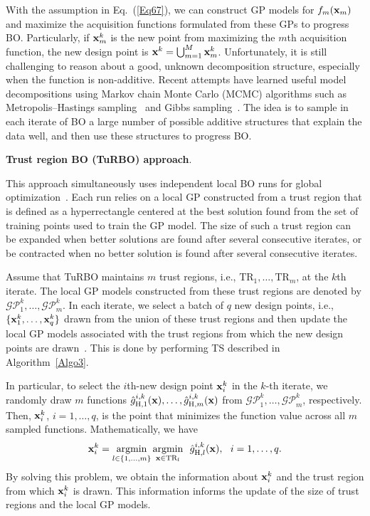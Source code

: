 \documentclass[iicol,sn-basic]{sn-jnl}%
\theoremstyle{thmstyleone}%
\theoremstyle{thmstyletwo}
\theoremstyle{thmstylethree}
\begin{document}
\begin{linenumbers}
With the assumption in Eq.~(\ref{Eq67}), we can construct GP models for $f_m({\bf x}_m)$ and maximize the acquisition functions formulated from these GPs to progress BO.
Particularly, if ${\bf x}^k_m$ is the new point from maximizing the $m$th acquisition function, the new design point is ${\bf x}^k = \bigcup_{m=1}^M {\bf x}^k_m$.
Unfortunately, it is still challenging to reason about a good, unknown decomposition structure, especially when the function is non-additive. 
Recent attempts have learned useful model decompositions using Markov chain Monte Carlo (MCMC) algorithms such as Metropolis–Hastings sampling~\citep{Gardner2017} and Gibbs sampling~\citep{ZWang2018}.
The idea is to sample in each iterate of BO a large number of possible additive structures that explain the data well, and then use these structures to progress BO.

\noindent 
\textbf{Trust region BO (TuRBO) approach}.

This approach simultaneously uses independent local BO runs for global optimization~\citep{Eriksson2019}.
Each run relies on a local GP constructed from a trust region that is defined as a hyperrectangle centered at the best solution found from the set of training points used to train the GP model.
The size of such a trust region can be expanded when better solutions are found after several consecutive iterates, or be contracted when no better solution is found after several consecutive iterates.

Assume that TuRBO maintains $m$ trust regions, i.e., $\text{TR}_1,\dots,\text{TR}_m$, at the $k$th iterate.
The local GP models constructed from these trust regions are denoted by $\mathcal{GP}_1^k,\dots,\mathcal{GP}_m^k$.
In each iterate, we select a batch of $q$ new design points, i.e., $\{{\bf x}_1^k,\dots,{\bf x}_q^k\}$ drawn from the union of these trust regions and then update the local GP models associated with the trust regions from which the new design points are drawn~\citep{Eriksson2019}.
This is done by performing TS described in Algorithm~\ref{Algo3}.

In particular, to select the $i$th-new design point ${\bf x}_i^k$ in the $k$-th iterate, we randomly draw $m$ functions $\hat{g}_{\text{H},1}^{i,k}({\bf x}), \dots,\hat{g}_{\text{H},m}^{i,k}({\bf x})$ from  $\mathcal{GP}_1^k,\dots,\mathcal{GP}_m^k$, respectively.
Then, ${\bf x}_i^k$, $i=1,\dots,q$, is the point that minimizes the  function value across all $m$ sampled functions.
Mathematically, we have~\citep{Eriksson2019}
\begin{equation}\label{Eq69}
	{\bf x}_i^k = \underset{l \in \{1,\dots,m\}}{\mathrm{argmin}}\,\underset{{\bf x} \in \text{TR}_l }{\mathrm{argmin}} \ \ \hat{g}_{\text{H},l}^{i,k}({\bf x}), \ \ i=1,\dots,q.
\end{equation}
By solving this problem, we obtain the information about ${\bf x}_i^k$ and the trust region from which ${\bf x}_i^k$ is drawn.
This information informs the update of the size of  trust regions and the local GP models.


\end{linenumbers}
\end{document}
